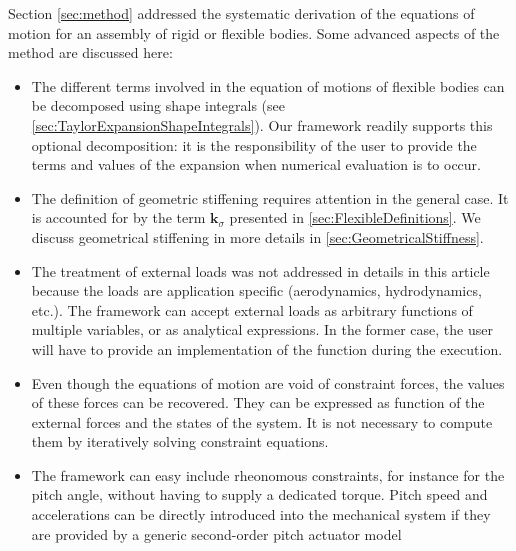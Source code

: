 \documentclass[wes, manuscript]{copernicus}
\renewcommand{\v}[1]{\boldsymbol{#1}}
\begin{document}
Section \ref{sec:method} addressed the systematic derivation of the equations of motion for an assembly of rigid or flexible bodies.
    Some advanced aspects of the method are discussed here:
\begin{itemize}
    \item
The different terms involved in the equation of motions of flexible bodies can be decomposed using shape integrals (see \autoref{sec:TaylorExpansionShapeIntegrals}).
% 
Our framework readily supports this optional decomposition: it is the responsibility of the user to provide the terms and values of the expansion when numerical evaluation is to occur.

    \item The definition of geometric stiffening requires attention in the general case.
    It is accounted for by the term $\v{k}_\sigma$ presented in \autoref{sec:FlexibleDefinitions}.
    We discuss geometrical stiffening in more details in \autoref{sec:GeometricalStiffness}.

    \item The treatment of external loads was not addressed in details in this article because the loads are application specific (aerodynamics, hydrodynamics, etc.).
    The framework can accept external loads as arbitrary functions of multiple variables, or as analytical expressions.
    In the former case, the user will have to provide an implementation of the function during the execution.

    \item Even though the equations of motion are void of constraint forces, the values of these forces can be recovered.
    They can be expressed as function of the external forces and the states of the system.
    It is not necessary to compute them by iteratively solving constraint equations.

    \item The framework can easy include rheonomous constraints, for instance for the pitch angle, without having to supply a dedicated torque.
    Pitch speed and accelerations can be directly introduced into the mechanical system if they are provided by a generic second-order pitch actuator model
\end{itemize}
\end{document}
